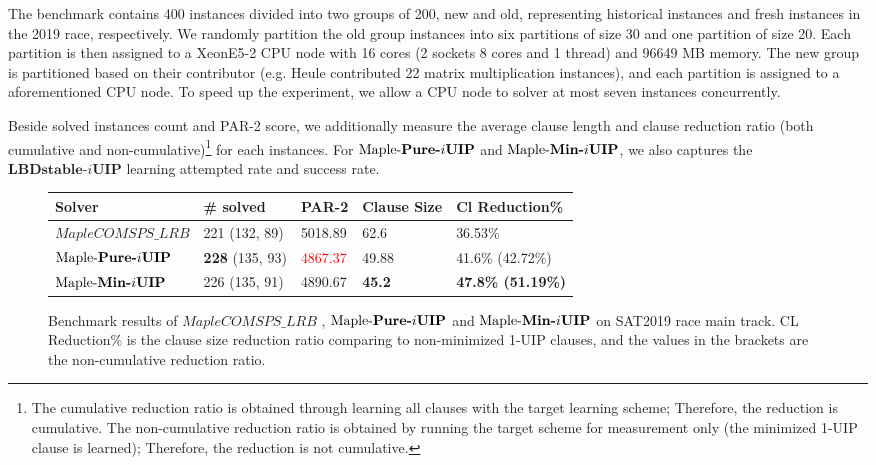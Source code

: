 \documentclass[runningheads]{llncs}
\newcommand{\IUIP}{\textbf{LBDstable-$i$UIP}}
\newcommand{\IUIPPURE}{\textbf{Pure-$i$UIP}}
\newcommand{\IUIPMIN}{\textbf{Min-$i$UIP}}
\newcommand{\MapleBase}{\textit{MapleCOMSPS\_LRB}}
\newcommand{\MapleIUIPPURE}{\text{Maple-\IUIPPURE}}
\newcommand{\MapleIUIMIN}{\text{Maple-\IUIPMIN}}
\newcommand{\nf}[1]{\textcolor{red}{#1}}
\begin{document}
The benchmark contains 400 instances divided into two groups of 200,
new and old, representing historical instances and fresh instances in
the 2019 race, respectively. We randomly partition the old group
instances into six partitions of size 30 and one partition of size
20. Each partition is then assigned to a XeonE5-2 CPU node with 16
cores (2 sockets 8 cores and 1 thread) and 96649 MB memory. The new
group is partitioned based on their contributor (e.g. Heule
contributed 22 matrix multiplication instances), and each partition is
assigned to a aforementioned CPU node. To speed up the experiment, we
allow a CPU node to solver at most seven instances concurrently.

Beside solved instances count and PAR-2 score, we additionally measure
the average clause length and clause reduction ratio (both cumulative
and non-cumulative)\footnote{The cumulative reduction ratio is
  obtained through learning all clauses with the target learning
  scheme; Therefore, the reduction is cumulative. The non-cumulative
  reduction ratio is obtained by running the target scheme for
  measurement only (the minimized 1-UIP clause is learned); Therefore,
  the reduction is not cumulative. }  for each instances. For
$\MapleIUIPPURE$ and $\MapleIUIMIN$, we also captures the $\IUIP$
learning attempted rate and success rate.

\begin{figure} 
\begin{center}
\begin{tabular}{ | m{3.3cm} | m{2cm}| m{2cm} | m{2cm} | m{2.7cm} | } 
\hline
Solver & \# solved & PAR-2 & Clause Size & Cl Reduction\% \\ 
\hline
$\MapleBase$ & 221 (132, 89) & 5018.89 & 62.6 & 36.53\% \\ 
\hline
$\MapleIUIPPURE$ & \textbf{228} (135, 93) & \nf{4867.37} & 49.88 & 41.6\%  (42.72\%)\\ 
\hline
$\MapleIUIMIN$ & 226 (135, 91) & 4890.67 & \textbf{45.2} & \textbf{47.8\% (51.19\%)}\\ 
\hline
\end{tabular}
\end{center}
\caption{Benchmark results of $\MapleBase$ , $\MapleIUIPPURE$  and $\MapleIUIMIN$ on SAT2019 race main track.
CL Reduction\% is the clause size reduction ratio comparing to non-minimized 1-UIP clauses, and the values in the brackets are the non-cumulative reduction ratio.}
\label{fig:t1}
\end{figure}
\end{document}
